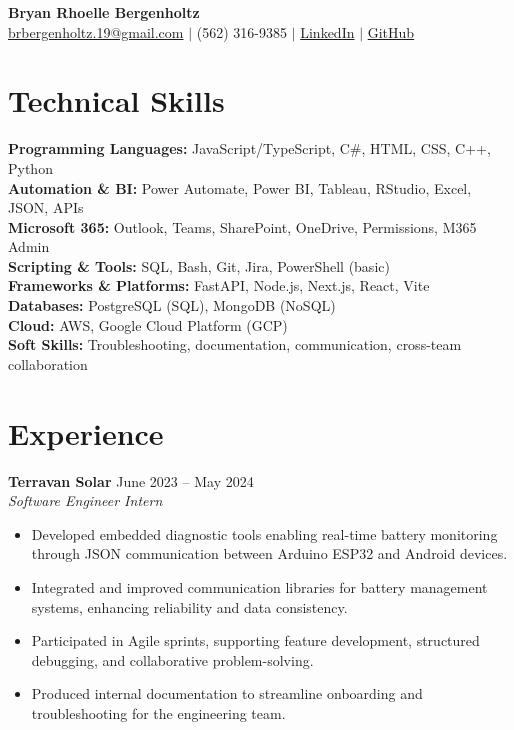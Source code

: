 \documentclass[a4paper,10pt]{article}
\newcommand{\dateright}[1]{\hfill {\small\textnormal{#1}}}
\begin{document}

\begin{center}
  {\LARGE \textbf{Bryan Rhoelle Bergenholtz}}\\[-1pt]
  \href{mailto:brbergenholtz.19@gmail.com}{brbergenholtz.19@gmail.com} $|$
  (562) 316-9385 $|$
  \href{https://linkedin.com/in/bryanbergenholtz}{LinkedIn} $|$
  \href{https://github.com/YanRho}{GitHub}
\end{center}

\section*{Technical Skills}
\textbf{Programming Languages:} JavaScript/TypeScript, C\#, HTML, CSS, C++, Python \\
\textbf{Automation \& BI:} Power Automate, Power BI, Tableau, RStudio, Excel, JSON, APIs \\
\textbf{Microsoft 365:} Outlook, Teams, SharePoint, OneDrive, Permissions, M365 Admin \\
\textbf{Scripting \& Tools:} SQL, Bash, Git, Jira, PowerShell (basic) \\
\textbf{Frameworks \& Platforms:} FastAPI, Node.js, Next.js, React, Vite \\
\textbf{Databases:} PostgreSQL (SQL), MongoDB (NoSQL) \\
\textbf{Cloud:} AWS, Google Cloud Platform (GCP) \\
\textbf{Soft Skills:} Troubleshooting, documentation, communication, cross-team collaboration


\section*{Experience}

\textbf{Terravan Solar} \dateright{June 2023 – May 2024}\\
\textit{Software Engineer Intern}
\begin{itemize}
  \item Developed embedded diagnostic tools enabling real-time battery monitoring through JSON communication between Arduino ESP32 and Android devices.
  \item Integrated and improved communication libraries for battery management systems, enhancing reliability and data consistency.
  \item Participated in Agile sprints, supporting feature development, structured debugging, and collaborative problem-solving.
  \item Produced internal documentation to streamline onboarding and troubleshooting for the engineering team.
\end{itemize}
\end{document}
